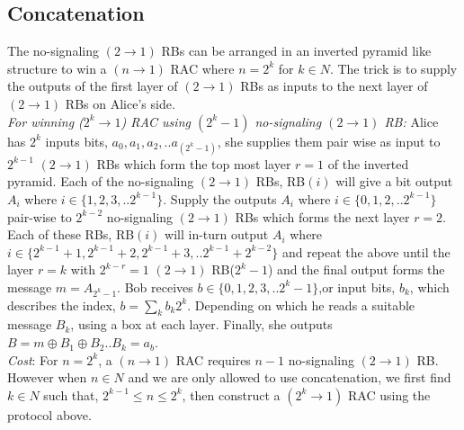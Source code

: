 \subsection*{Concatenation}
The no-signaling $(2\rightarrow 1)$ RBs can be arranged in an inverted pyramid like structure to win a $(n\rightarrow 1)$ RAC where $n=2^{k}$ for $k\in {N}$. The trick is to
supply the outputs of the first layer of $(2\rightarrow 1)$ RBs as inputs to the next layer of $(2\rightarrow1)$ RBs on Alice's side. \\
\textit{For winning ($2^k \rightarrow 1$) RAC using $(2^k-1)$  no-signaling $(2\rightarrow 1)$ RB:} 
Alice has $2^{k}$ inputs bits, $a_{0},a_{1},a_{2},..a_{(2^{k}-1)}$,
she supplies them pair wise as input to $2^{k-1}$ $(2\rightarrow 1)$ RBs
which form the top most layer $r=1$ of the inverted pyramid. Each
of the no-signaling $(2\rightarrow 1)$ RBs, RB$(i)$ will give a bit output $A_{i}$ where
$i\in\{1,2,3,..2^{k-1}\}$.
Supply the outputs $A_{i}$ where $i\in\{0,1,2,..2^{k-1}\}$ pair-wise to $2^{k-2}$ no-signaling $(2\rightarrow 1)$ RBs which forms the next layer $r=2$.
Each of these RBs, RB$(i)$ will in-turn output $A_{i}$ where $i\in\{2^{k-1}+1,2^{k-1}+2,2^{k-1}+3,..2^{k-1}+2^{k-2}\}$ and repeat the above until the layer $r=k$ with $2^{k-r}=1$ $(2\rightarrow 1)$ RB($2^{k}-1$) and the final output forms the message $m=A_{2^{k}-1}$.
Bob receives $b\in\{0,1,2,3,..2^{k}-1\}$,or input bits, $b_{k}$,
which describes the index, $b=\sum_{k}b_{k}2^{k}$. Depending on which
he reads a suitable message $B_{k}$, using a box at each layer. Finally,
she outputs $B=m\oplus B_{1}\oplus B_{2}..B_{k}=a_{b}$. \\
\textit{Cost}: For $n=2^{k}$, a $(n\rightarrow1)$ RAC requires $n-1$ no-signaling $(2\rightarrow 1)$
RB. However when $n\in{N}$ and
we are only allowed to use concatenation, we first find $k\in {N}$
such that, $2^{k-1}\leq n\leq2^{k}$, then construct a $(2^{k}\rightarrow1)$
RAC using the protocol above.

